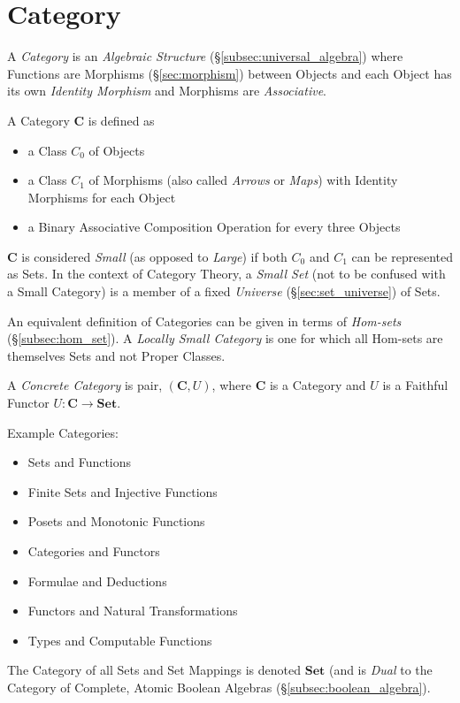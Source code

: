 \section{Category}\label{sec:category}

A \emph{Category} is an \emph{Algebraic Structure}
(\S\ref{subsec:universal_algebra}) where Functions are Morphisms
(\S\ref{sec:morphism}) between Objects and each Object has
its own \emph{Identity Morphism} and Morphisms are \emph{Associative}.

A Category $\mathbf{C}$ is defined as
\begin{itemize}
\item a Class $C_0$ of Objects
\item a Class $C_1$ of Morphisms (also called \emph{Arrows} or
  \emph{Maps}) with Identity Morphisms for each Object
\item a Binary Associative Composition Operation for every three
  Objects
\end{itemize}
$\mathbf{C}$ is considered \emph{Small} (as opposed to \emph{Large})
if both $C_0$ and $C_1$ can be represented as Sets. In the context of
Category Theory, a \emph{Small Set} (not to be confused with a Small
Category) is a member of a fixed \emph{Universe}
(\S\ref{sec:set_universe}) of Sets.

An equivalent definition of Categories can be given in terms of
\emph{Hom-sets} (\S\ref{subsec:hom_set}). A \emph{Locally Small
Category} is one for which all Hom-sets are themselves Sets and not
  Proper Classes.

A \emph{Concrete Category} is pair, $(\mathbf{C},U)$, where
$\mathbf{C}$ is a Category and $U$ is a Faithful Functor $U :
\mathbf{C} \rightarrow \mathbf{Set}$.

Example Categories:
\begin{itemize}
\item Sets and Functions
\item Finite Sets and Injective Functions
\item Posets and Monotonic Functions
\item Categories and Functors
\item Formulae and Deductions
\item Functors and Natural Transformations
\item Types and Computable Functions
\end{itemize}
The Category of all Sets and Set Mappings is denoted $\mathbf{Set}$
(and is \emph{Dual} to the Category of Complete, Atomic Boolean
Algebras (\S\ref{subsec:boolean_algebra}).

